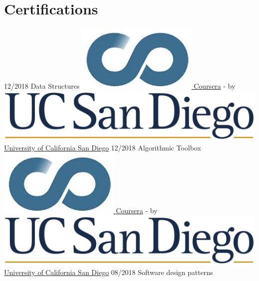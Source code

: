 \documentclass[a4paper]{./classes/friggeri-cv}
\begin{document}
    \section{Certifications}\label{sec:certifications}
    \begin{entrylist}
        \entry
        {12/2018}
        {Data Structures}
        {\href{http://coursera.org/}{\includegraphics[scale=0.08]{../assets/images/logos/Coursera_logo.jpg} Coursera} - by \href{https://ucsd.edu/}{\includegraphics[scale=0.015]{../assets/images/logos/UCSD_logo.png} University of California San Diego}}
        {}
        \entry
        {12/2018}
        {Algorithmic Toolbox}
        {\href{http://coursera.org/}{\includegraphics[scale=0.08]{../assets/images/logos/Coursera_logo.jpg} Coursera} - by \href{https://ucsd.edu/}{\includegraphics[scale=0.015]{../assets/images/logos/UCSD_logo.png} University of California San Diego}}
        {}
        \entry
        {08/2018}
        {Software design patterns}

\end{entrylist}
\end{document}
